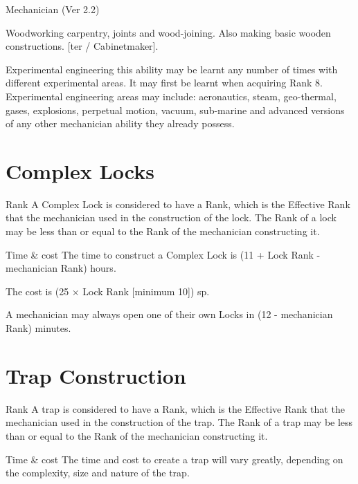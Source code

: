 \begin{Chapter}{Mechanician (Ver 2.2)}
\begin{Description}
\item[Woodworking] carpentry, joints and wood-joining.  Also making
  basic wooden constructions. [ter / Cabinetmaker].

\item[Experimental] engineering this ability may be learnt any number
  of times with different experimental areas. It may first be learnt
  when acquiring Rank 8.  Experimental engineering areas may include:
  aeronautics, steam, geo-thermal, gases, explosions, perpetual
  motion, vacuum, sub-marine and advanced versions of any other
  mechanician ability they already possess.

  \end{Description}

\section{Complex Locks}

\begin{Description}

\item[Rank] A Complex Lock is considered to have a Rank, which is the
  Effective Rank that the mechanician used in the construction of the
  lock.  The Rank of a lock may be less than or equal to the Rank of
  the mechanician constructing it.

\item[Time \& cost] The time to construct a Complex Lock is (11 + Lock
  Rank - mechanician Rank) hours.

The cost is (25 × Lock Rank [minimum 10]) sp. 

A mechanician may always open one of their own Locks in (12 -
mechanician Rank) minutes.

\end{Description}

\section{Trap Construction}

\begin{Description}

\item[Rank] A trap is considered to have a Rank, which is the
  Effective Rank that the mechanician used in the construction of the
  trap.  The Rank of a trap may be less than or equal to the Rank of
  the mechanician constructing it.

\item[Time \& cost] The time and cost to create a trap will vary
  greatly, depending on the complexity, size and nature of the trap.


\end{Description}
\end{Chapter}
